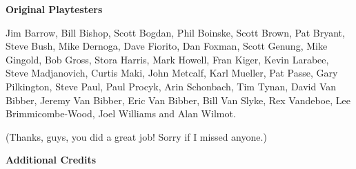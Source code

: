 \begin{center}
\textbf{\Large Original Playtesters}
\end{center}

{
\sloppy
Jim Barrow, Bill Bishop, Scott Bogdan, Phil Boinske, Scott Brown, Pat Bryant, Steve Bush, Mike Dernoga, Dave Fiorito, Dan Foxman, Scott Genung, Mike Gingold, Bob Gross, Stora Harris, Mark Howell, Fran Kiger, Kevin Larabee, Steve Madjanovich, Curtis Maki, John Metcalf, Karl Mueller, Pat Passe, Gary Pilkington, Steve Paul, Paul Procyk, Arin Schonbach, Tim Tynan, David Van Bibber, Jeremy Van Bibber, Eric Van Bibber, Bill Van Slyke, Rex Vandeboe, Lee Brimmicombe-Wood, Joel Williams and Alan Wilmot.
\par
}

(Thanks, guys, you did a great job! Sorry if I missed anyone.)

\newpage
\twocolumn

\begin{center}
\textbf{\Large Additional Credits}
\end{center}

